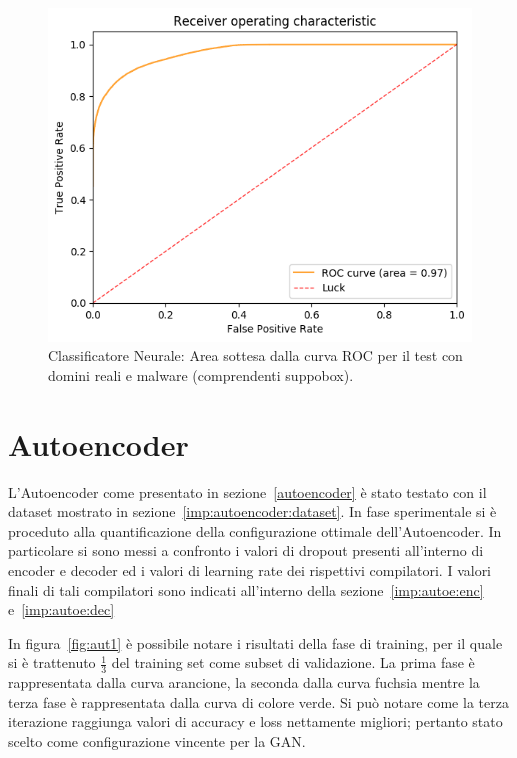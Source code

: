 \begin{figure}[!bp]
    \centering
    \includegraphics[width=\columnwidth]{figures/clas_nn/roc_plot.png}
    \caption{Classificatore Neurale: Area sottesa dalla curva ROC per il test con domini reali e malware (comprendenti suppobox).\label{fig:cnrocall}}
\end{figure}

\newpage
\section{Autoencoder}
\label{ris:autoenc}
L'Autoencoder come presentato in sezione~\ref{autoencoder} è stato testato con il dataset mostrato in sezione~\ref{imp:autoencoder:dataset}. In fase sperimentale si è proceduto alla quantificazione della configurazione ottimale dell'Autoencoder. In particolare si sono messi a confronto i valori di dropout presenti all'interno di encoder e decoder ed i valori di learning rate dei rispettivi compilatori. I valori finali di tali compilatori sono indicati all'interno della sezione~\ref{imp:autoe:enc} e~\ref{imp:autoe:dec}

In figura~\ref{fig:aut1} è possibile notare i risultati della fase di training, per il quale si è trattenuto $\frac{1}{3}$ del training set come subset di validazione.  La prima fase è rappresentata dalla curva arancione, la seconda dalla curva fuchsia mentre la terza fase è rappresentata dalla curva di colore verde. Si può notare come la terza iterazione raggiunga valori di accuracy e loss  nettamente migliori; pertanto stato scelto come configurazione vincente per la GAN.


